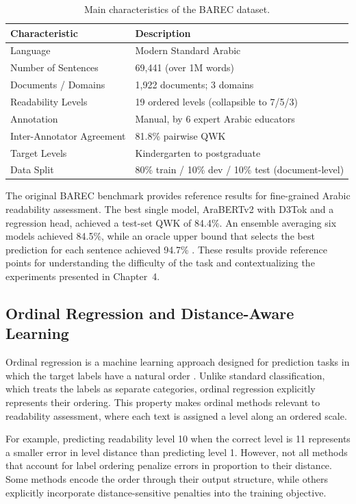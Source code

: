 \documentclass[12pt]{report}
\begin{document}
\begin{table}[H]
\centering
\caption{Main characteristics of the BAREC dataset.}
\label{tab:barec_characteristics}
\vspace{3mm}
\begin{tabular}{p{5cm} p{6cm}}
\toprule
\textbf{Characteristic} & \textbf{Description} \\
\midrule
Language & Modern Standard Arabic \\
Number of Sentences & 69,441 (over 1M words) \\
Documents / Domains & 1,922 documents; 3 domains \\
Readability Levels & 19 ordered levels (collapsible to 7/5/3) \\
Annotation & Manual, by 6 expert Arabic educators \\
Inter-Annotator Agreement & 81.8\% pairwise QWK \\
Target Levels & Kindergarten to postgraduate \\
Data Split & 80\% train / 10\% dev / 10\% test (document-level) \\
\bottomrule
\end{tabular}
\end{table}

The original BAREC benchmark provides reference results for fine-grained Arabic readability assessment. The best single model, AraBERTv2 with D3Tok and a regression head, achieved a test-set QWK of 84.4\%. An ensemble averaging six models achieved 84.5\%, while an oracle upper bound that selects the best prediction for each sentence achieved 94.7\% \cite{elmadani2025barec}. These results provide reference points for understanding the difficulty of the task and contextualizing the experiments presented in Chapter~4.    

\subsection{Ordinal Regression and Distance-Aware Learning}
Ordinal regression is a machine learning approach designed for prediction tasks in which the target labels have a natural order \cite{gutierrez2016ordinal}. Unlike standard classification, which treats the labels as separate categories, ordinal regression explicitly represents their ordering. This property makes ordinal methods relevant to readability assessment, where each text is assigned a level along an ordered scale.

For example, predicting readability level 10 when the correct level is 11 represents a smaller error in level distance than predicting level 1. However, not all methods that account for label ordering penalize errors in proportion to their distance. Some methods encode the order through their output structure, while others explicitly incorporate distance-sensitive penalties into the training objective.
\end{document}
